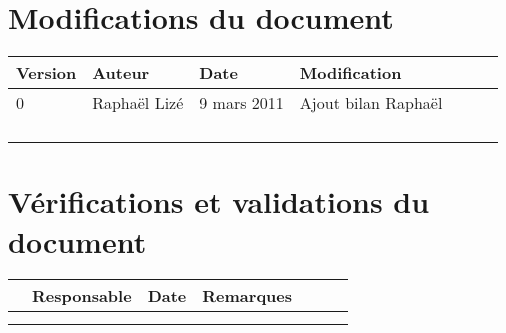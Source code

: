 
\section*{Modifications du document}

\begin{center}
\begin{longtable}{|m{14mm}|m{36mm}|m{36mm}|m{60mm}|}
\hline
Version & Auteur & Date & Modification\endhead \hline
& %
& %
& %
\\\hline
0
& %
Raphaël Lizé
& %
9 mars 2011
& %
Ajout bilan Raphaël
\\\hline
& %
& %
& %
\\\hline
& %
& %
& %
\\\hline

& %

& %

& %

\\\hline

& %

& %

& %

\\\hline
\end{longtable}
\end{center}


\section*{Vérifications et validations du document}

\begin{center}
\begin{longtable}{|m{15mm}|m{36mm}|m{36mm}|m{60mm}|}
\hline
 & Responsable & Date & Remarques\endhead \hline
& %
& %
& %
\\\hline
& %
& %
& %
\\\hline
& %
& %
& %
\\\hline
\end{longtable}
\end{center}

\pagebreak
